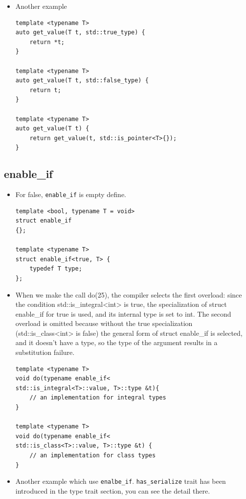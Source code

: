 \documentclass[a4paper,11pt,twoside]{book}
\begin{document}
\begin{itemize}
\item Another example	
	
\begin{lstlisting}[numbers=none]
template <typename T>
auto get_value(T t, std::true_type) {
	return *t;
}

template <typename T>
auto get_value(T t, std::false_type) {
	return t;
}

template <typename T>
auto get_value(T t) {
	return get_value(t, std::is_pointer<T>{}); 
}
\end{lstlisting}	
\end{itemize}


\subsection{enable\_if}
\begin{itemize}
	
	\item For false, \texttt{enable\_if} is empty define.
\begin{lstlisting}[numbers=none]
template <bool, typename T = void>
struct enable_if
{};

template <typename T>
struct enable_if<true, T> {
	typedef T type;
};	
\end{lstlisting}	

\item When we make the call do(25), the compiler selects the first overload: since the condition std::is\_integral<int> is true, the specialization of struct enable\_if for true is used, and its internal type is set to int. The second overload is omitted because without the true specialization (std::is\_class<int> is false) the general form of struct enable\_if is selected, and it doesn't have a type, so the type of the argument results in a substitution failure.

\begin{lstlisting}[numbers=none]
template <typename T>
void do(typename enable_if<
std::is_integral<T>::value, T>::type &t){
	// an implementation for integral types 
}

template <typename T>
void do(typename enable_if<
std::is_class<T>::value, T>::type &t) {
	// an implementation for class types
}		
\end{lstlisting}	
	
	\item Another example which use \texttt{enalbe\_if}. \texttt{has\_serialize} trait has been introduced in the type trait section, you can see the detail there. 
	

\end{itemize}
\end{document}
